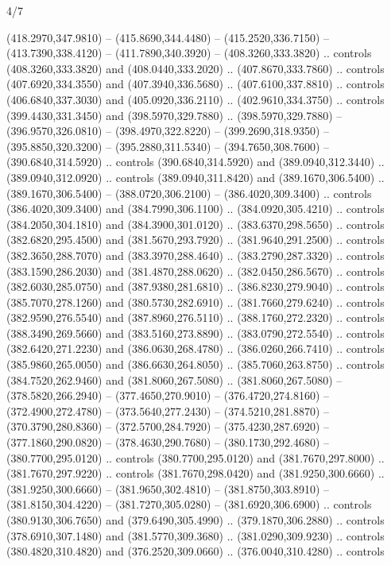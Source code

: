 \begin{flagdescription}{4/7}
\begin{scope}[shift={(0.5\flaglength,0.5\flagwidth)},scale=\flagwidth*\stretchfactor/820]
\begin{scope}[scale=1.87,xshift=-138mm,yshift=75mm]
\begin{scope}[y=0.8pt, x=0.8pt, yscale=-1, xscale=1]
\begin{scope}[fill=c9ca168]
  (418.2970,347.9810) -- (415.8690,344.4480) -- (415.2520,336.7150) --
  (413.7390,338.4120) -- (411.7890,340.3920) -- (408.3260,333.3820) .. controls
  (408.3260,333.3820) and (408.0440,333.2020) .. (407.8670,333.7860) .. controls
  (407.6920,334.3550) and (407.3940,336.5680) .. (407.6100,337.8810) .. controls
  (406.6840,337.3030) and (405.0920,336.2110) .. (402.9610,334.3750) .. controls
  (399.4430,331.3450) and (398.5970,329.7880) .. (398.5970,329.7880) --
  (396.9570,326.0810) -- (398.4970,322.8220) -- (399.2690,318.9350) --
  (395.8850,320.3200) -- (395.2880,311.5340) -- (394.7650,308.7600) --
  (390.6840,314.5920) .. controls (390.6840,314.5920) and (389.0940,312.3440) ..
  (389.0940,312.0920) .. controls (389.0940,311.8420) and (389.1670,306.5400) ..
  (389.1670,306.5400) -- (388.0720,306.2100) -- (386.4020,309.3400) .. controls
  (386.4020,309.3400) and (384.7990,306.1100) .. (384.0920,305.4210) .. controls
  (384.2050,304.1810) and (384.3900,301.0120) .. (383.6370,298.5650) .. controls
  (382.6820,295.4500) and (381.5670,293.7920) .. (381.9640,291.2500) .. controls
  (382.3650,288.7070) and (383.3970,288.4640) .. (383.2790,287.3320) .. controls
  (383.1590,286.2030) and (381.4870,288.0620) .. (382.0450,286.5670) .. controls
  (382.6030,285.0750) and (387.9380,281.6810) .. (386.8230,279.9040) .. controls
  (385.7070,278.1260) and (380.5730,282.6910) .. (381.7660,279.6240) .. controls
  (382.9590,276.5540) and (387.8960,276.5110) .. (388.1760,272.2320) .. controls
  (388.3490,269.5660) and (383.5160,273.8890) .. (383.0790,272.5540) .. controls
  (382.6420,271.2230) and (386.0630,268.4780) .. (386.0260,266.7410) .. controls
  (385.9860,265.0050) and (386.6630,264.8050) .. (385.7060,263.8750) .. controls
  (384.7520,262.9460) and (381.8060,267.5080) .. (381.8060,267.5080) --
  (378.5820,266.2940) -- (377.4650,270.9010) -- (376.4720,274.8160) --
  (372.4900,272.4780) -- (373.5640,277.2430) -- (374.5210,281.8870) --
  (370.3790,280.8360) -- (372.5700,284.7920) -- (375.4230,287.6920) --
  (377.1860,290.0820) -- (378.4630,290.7680) -- (380.1730,292.4680) --
  (380.7700,295.0120) .. controls (380.7700,295.0120) and (381.7670,297.8000) ..
  (381.7670,297.9220) .. controls (381.7670,298.0420) and (381.9250,300.6660) ..
  (381.9250,300.6660) -- (381.9650,302.4810) -- (381.8750,303.8910) --
  (381.8150,304.4220) -- (381.7270,305.0280) -- (381.6920,306.6900) .. controls
  (380.9130,306.7650) and (379.6490,305.4990) .. (379.1870,306.2880) .. controls
  (378.6910,307.1480) and (381.5770,309.3680) .. (381.0290,309.9230) .. controls
  (380.4820,310.4820) and (376.2520,309.0660) .. (376.0040,310.4280) .. controls

\end{scope}
\end{scope}
\end{scope}
\end{scope}
\end{flagdescription}
